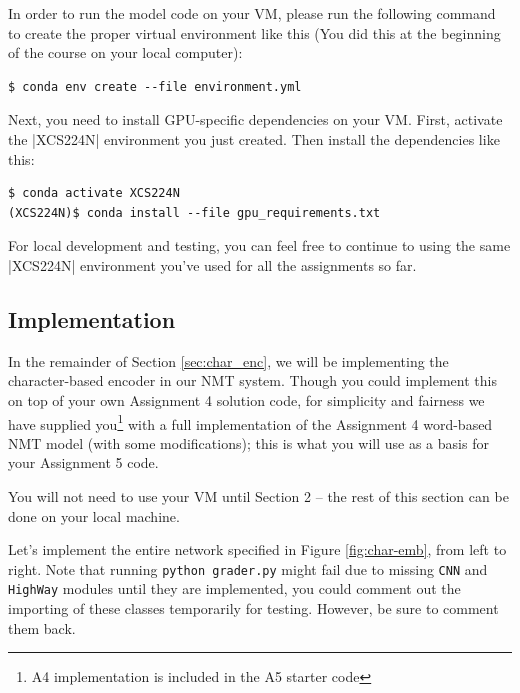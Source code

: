 In order to run the model code on your VM, please run the following command to create the proper virtual environment like this (You did this at the beginning of the course on your local computer):

\begin{lstlisting}
$ conda env create --file environment.yml
\end{lstlisting}

Next, you need to install GPU-specific dependencies on your VM.  First, activate the |XCS224N| environment you just created.  Then install the dependencies like this:

\begin{lstlisting}
$ conda activate XCS224N
(XCS224N)$ conda install --file gpu_requirements.txt
\end{lstlisting}

For local development and testing, you can feel free to continue to using the same |XCS224N| environment you've used for all the assignments so far.

\subsection*{Implementation}
In the remainder of Section \ref{sec:char_enc}, we will be implementing the character-based encoder in our NMT system.
Though you could implement this on top of your own Assignment 4 solution code, for simplicity and fairness we have supplied you\footnote{A4 implementation is included in the A5 starter code} with a full implementation of the Assignment 4 word-based NMT model (with some modifications); this is what you will use as a basis for your Assignment 5 code. 

You will not need to use your VM until Section 2 -- the rest of this section can be done on your local machine.

Let's implement the entire network specified in Figure \ref{fig:char-emb}, from left to right. Note that running \texttt{python grader.py} might fail due to missing \texttt{CNN} and \texttt{HighWay} modules until they are implemented, you could comment out the importing of these classes temporarily for testing. However, be sure to comment them back.

